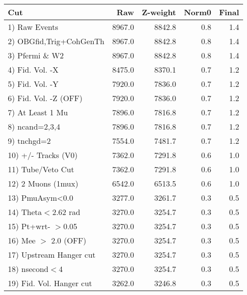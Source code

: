  \begin{table}[h!]\centering
 \begin{tabular}{||l||r|r|r|r||}
 \hline
 \hline
 Cut & Raw & Z-weight & Norm0 & Final \\
 \hline
  1) Raw Events           &      8967.0 &      8842.8 &         0.8 &         1.4 \\
  2) OBGfid,Trig+CohGenTh &      8967.0 &      8842.8 &         0.8 &         1.4 \\
  3) Pfermi \& W2         &      8967.0 &      8842.8 &         0.8 &         1.4 \\
  4) Fid. Vol. -X         &      8475.0 &      8370.1 &         0.7 &         1.2 \\
  5) Fid. Vol. -Y         &      7920.0 &      7836.0 &         0.7 &         1.2 \\
  6) Fid. Vol. -Z (OFF)   &      7920.0 &      7836.0 &         0.7 &         1.2 \\
  7) At Least 1 Mu        &      7896.0 &      7816.8 &         0.7 &         1.2 \\
  8) ncand=2,3,4          &      7896.0 &      7816.8 &         0.7 &         1.2 \\
  9) tnchgd=2             &      7554.0 &      7481.7 &         0.7 &         1.2 \\
 10) +/- Tracks (V0)      &      7362.0 &      7291.8 &         0.6 &         1.0 \\
 11) Tube/Veto Cut        &      7362.0 &      7291.8 &         0.6 &         1.0 \\
 12) 2 Muons (1mux)       &      6542.0 &      6513.5 &         0.6 &         1.0 \\
 13) PmuAsym<0.0          &      3277.0 &      3261.7 &         0.3 &         0.5 \\
 14) Theta$<$2.62 rad     &      3270.0 &      3254.7 &         0.3 &         0.5 \\
 15) Pt+wrt- $>$0.05      &      3270.0 &      3254.7 &         0.3 &         0.5 \\
 16) Mee $>$ 2.0  (OFF)   &      3270.0 &      3254.7 &         0.3 &         0.5 \\
 17) Upstream Hanger cut  &      3270.0 &      3254.7 &         0.3 &         0.5 \\
 18) nsecond$<$4          &      3270.0 &      3254.7 &         0.3 &         0.5 \\
 19) Fid. Vol. Hanger cut &      3262.0 &      3246.8 &         0.3 &         0.5 \\

\end{tabular}
\end{table}

